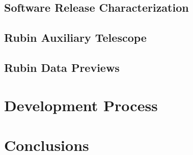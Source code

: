 \subsection{Software Release Characterization } \label{ssec:characterization}

\subsection{Rubin Auxiliary Telescope} \label{ssec:auxtel}

\subsection{Rubin Data Previews} \label{ssec:datapreviews}

\section{Development Process} \label{sec:development}


\section{Conclusions} \label{sec:conclusions}
